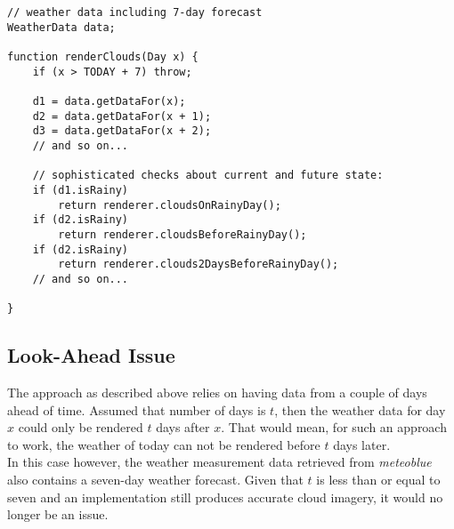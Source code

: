 \begin{lstlisting}[language=HLSL, caption=Pseudo-code of cloud render algorithm, label=lst:pseudo:algorithm]
// weather data including 7-day forecast
WeatherData data;

function renderClouds(Day x) {
    if (x > TODAY + 7) throw;

    d1 = data.getDataFor(x);
    d2 = data.getDataFor(x + 1);
    d3 = data.getDataFor(x + 2);
    // and so on...

    // sophisticated checks about current and future state:
    if (d1.isRainy)
        return renderer.cloudsOnRainyDay();
    if (d2.isRainy) 
        return renderer.cloudsBeforeRainyDay();
    if (d2.isRainy) 
        return renderer.clouds2DaysBeforeRainyDay();
    // and so on...
    
}
\end{lstlisting}

\clearpage

\subsection{Look-Ahead Issue}
The approach as described above relies on having data from a couple of days ahead of time. Assumed that number of days is $t$, then the weather data for day $x$ could only be rendered $t$ days after $x$.
That would mean, for such an approach to work, the weather of today can not be rendered before $t$ days later.
\\
In this case however, the weather measurement data retrieved from \emph{meteoblue} also contains a seven-day weather forecast. 
Given that $t$ is less than or equal to seven and an implementation still produces accurate cloud imagery, it would no longer be an issue.

